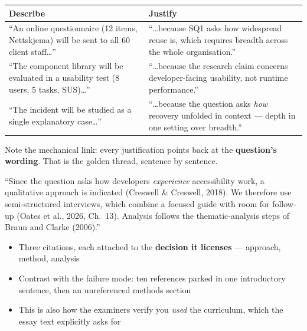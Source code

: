 \documentclass[11pt,a4paper,british,twoside=false,headings=small,chapterprefix=false,numbers=noenddot]{scrbook}
\newenvironment{block}[1]{\begin{tcolorbox}[scriptbox, title={#1}]}{\end{tcolorbox}}
\begin{document}
\begin{center}\small
\footnotesize
  \renewcommand{\arraystretch}{1.4}
  \begin{tabular}{@{}p{5.9cm}p{7.3cm}@{}}
    \toprule
    \textbf{Describe} & \textbf{Justify}\\
    \midrule
    ``An online questionnaire (12 items, Nettskjema) will be sent to all 60 client staff\dots'' & ``\dots because SQ1 asks how widespread reuse is, which requires breadth across the whole organisation.''\\
    ``The component library will be evaluated in a usability test (8 users, 5 tasks, SUS)\dots'' & ``\dots because the research claim concerns developer-facing usability, not runtime performance.''\\
    ``The incident will be studied as a single explanatory case\dots'' & ``\dots because the question asks \emph{how} recovery unfolded in context --- depth in one setting over breadth.''\\
    \bottomrule
  \end{tabular}
  

  Note the mechanical link: every justification points back at the
  \textbf{question's wording}. That is the golden thread, sentence by
  sentence.
\end{center}

\begin{center}\small
\small
  \begin{block}{Where the references belong}
    ``Since the question asks how developers \emph{experience} accessibility
    work, a qualitative approach is indicated (Creswell \& Creswell, 2018).
    We therefore use semi-structured interviews, which combine a focused
    guide with room for follow-up (Oates et al., 2026, Ch.\ 13). Analysis
    follows the thematic-analysis steps of Braun and Clarke (2006).''
  \end{block}
  
  \begin{itemize}\setlength{\itemsep}{0.4em}
    \item Three citations, each attached to the \textbf{decision it
          licenses} --- approach, method, analysis
    \item Contrast with the failure mode: ten references parked in one
          introductory sentence, then an unreferenced methods section
    \item This is also how the examiners verify you \emph{used} the
          curriculum, which the essay text explicitly asks for
  \end{itemize}
\end{center}
\end{document}

